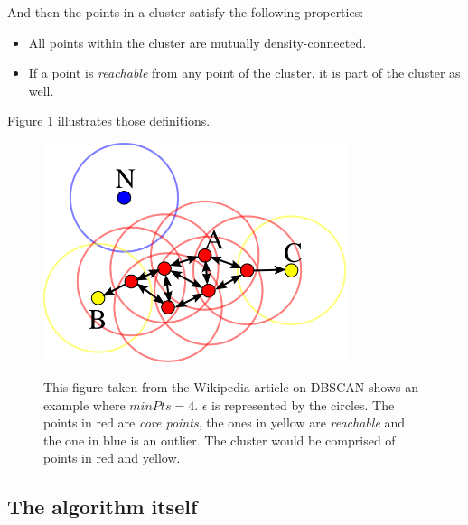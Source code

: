 And then the points in a cluster satisfy the following properties\cite{dbscan}:
\begin{itemize}
	\item All points within the cluster are mutually density-connected.
	\item If a point is \emph{reachable} from any point of the cluster, it is part of the cluster as well.
\end{itemize}

Figure \ref{fig:reachExample} illustrates those definitions.

\begin{figure}
\centering
{\includegraphics[width=3.5in]{images/reach_example.png}}
\caption{This figure taken from the Wikipedia article on DBSCAN \cite{dbscan} shows an example where $minPts=4$. $\epsilon$ is represented by the circles. The points in red are \emph{core points}, the ones in yellow are \emph{reachable} and the one in blue is an outlier. The cluster would be comprised of points in red and yellow.}
\label{fig:reachExample}
\end{figure}

\subsection{The algorithm itself}

